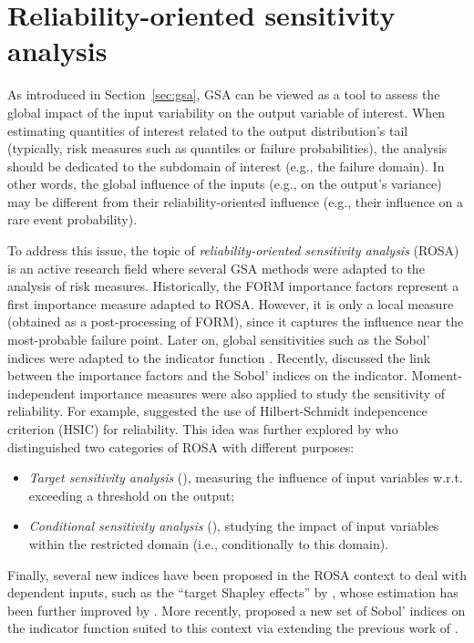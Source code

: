 \section{Reliability-oriented sensitivity analysis}\label{sec:bancs_rosa}


As introduced in Section~\ref{sec:gsa}, GSA can be viewed as a tool to assess the global impact of the input variability on the output variable of interest. 
When estimating quantities of interest related to the output distribution's tail (typically, risk measures such as quantiles or failure probabilities), the analysis should be dedicated to the subdomain of interest (e.g., the failure domain). 
In other words, the global influence of the inputs (e.g., on the output's variance) may be different from their reliability-oriented influence (e.g., their influence on a rare event probability). 

To address this issue, the topic of \textit{reliability-oriented sensitivity analysis} (ROSA) is an active research field where several GSA methods were adapted to the analysis of risk measures. 
Historically, the FORM importance factors represent a first importance measure adapted to ROSA. 
However, it is only a local measure (obtained as a post-processing of FORM), since it captures the influence near the most-probable failure point.  
Later on, global sensitivities such as the Sobol' indices were adapted to the indicator function \citep{wei_2012_rosa,chabridon_2018_thesis,perrin_2019_rosa}. 
Recently, \citet{papaioannou_2021_rosa_form} discussed the link between the importance factors and the Sobol' indices on the indicator. 
Moment-independent importance measures were also applied to study the sensitivity of reliability. 
For example, \citet{daveiga_2015} suggested the use of Hilbert-Schmidt indepencence criterion (HSIC) for reliability. 
This idea was further explored by \citet{marrel_chabridon_2021} who distinguished two categories of ROSA with different purposes: 
\begin{itemize}
    \item \textit{Target sensitivity analysis} (), measuring the influence of input variables w.r.t. exceeding a threshold on the output; 
    \item \textit{Conditional sensitivity analysis} (), studying the impact of input variables within the restricted domain (i.e., conditionally to this domain).
\end{itemize}
Finally, several new indices have been proposed in the ROSA context to deal with dependent inputs, such as the ``target Shapley effects'' by \citet{ilidrissi_2021_rosa}, whose estimation has been further improved by \citet{demange_2023_ijuq}. 
More recently, \citet{ehre_2024_vb_rosa} proposed a new set of Sobol' indices on the indicator function suited to this context via extending the previous work of \citet{mara_tarantola_2012}.

